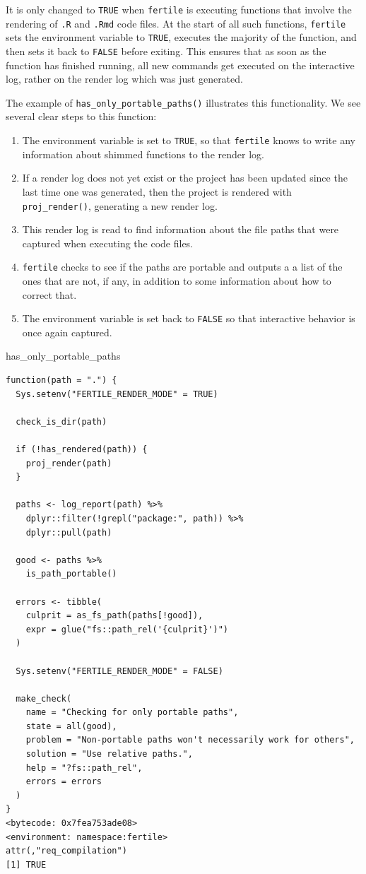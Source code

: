 \documentclass[12pt,twoside]{reedthesis}
\newenvironment{Shaded}{\begin{snugshade}}{\end{snugshade}}
\newcommand{\NormalTok}[1]{#1}
\begin{document}
It is only changed to \texttt{TRUE} when \texttt{fertile} is executing functions that involve the rendering of \texttt{.R} and \texttt{.Rmd} code files. At the start of all such functions, \texttt{fertile} sets the environment variable to \texttt{TRUE}, executes the majority of the function, and then sets it back to \texttt{FALSE} before exiting. This ensures that as soon as the function has finished running, all new commands get executed on the interactive log, rather on the render log which was just generated.

The example of \texttt{has\_only\_portable\_paths()} illustrates this functionality. We see several clear steps to this function:
\begin{enumerate}
\def\labelenumi{\arabic{enumi}.}
\item
  The environment variable is set to \texttt{TRUE}, so that \texttt{fertile} knows to write any information about shimmed functions to the render log.
\item
  If a render log does not yet exist or the project has been updated since the last time one was generated, then the project is rendered with \texttt{proj\_render()}, generating a new render log.
\item
  This render log is read to find information about the file paths that were captured when executing the code files.
\item
  \texttt{fertile} checks to see if the paths are portable and outputs a a list of the ones that are not, if any, in addition to some information about how to correct that.
\item
  The environment variable is set back to \texttt{FALSE} so that interactive behavior is once again captured.
\end{enumerate}
\begin{Shaded}
\begin{Highlighting}[]
\NormalTok{has_only_portable_paths}
\end{Highlighting}
\end{Shaded}
\begin{verbatim}
function(path = ".") {
  Sys.setenv("FERTILE_RENDER_MODE" = TRUE)

  check_is_dir(path)

  if (!has_rendered(path)) {
    proj_render(path)
  }

  paths <- log_report(path) %>%
    dplyr::filter(!grepl("package:", path)) %>%
    dplyr::pull(path)

  good <- paths %>%
    is_path_portable()

  errors <- tibble(
    culprit = as_fs_path(paths[!good]),
    expr = glue("fs::path_rel('{culprit}')")
  )

  Sys.setenv("FERTILE_RENDER_MODE" = FALSE)

  make_check(
    name = "Checking for only portable paths",
    state = all(good),
    problem = "Non-portable paths won't necessarily work for others",
    solution = "Use relative paths.",
    help = "?fs::path_rel",
    errors = errors
  )
}
<bytecode: 0x7fea753ade08>
<environment: namespace:fertile>
attr(,"req_compilation")
[1] TRUE
\end{verbatim}
\end{document}
